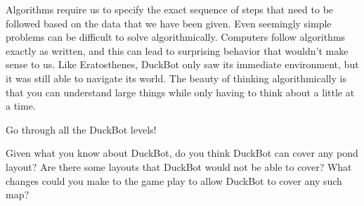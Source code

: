 Algorithms require us to specify the exact sequence of steps that need to be followed based on the
data that we have been given. Even seemingly simple problems can be difficult to solve
algorithmically. Computers follow algorithms exactly as written, and this can lead to surprising
behavior that wouldn't make sense to us.  Like Eratosthenes, DuckBot only
saw its immediate environment, but it was still able to navigate its world. The beauty of thinking
algorithmically is that you can understand large things while only having to think about a little at
a time.

\Exercises

\begin{exercises}
\item Go through all the DuckBot levels!

\item Given what you know about DuckBot, do you think DuckBot can cover any pond layout? Are there
  some layouts that DuckBot would not be able to cover? What changes could you make to the game play
  to allow DuckBot to cover any such map?
\end{exercises}


